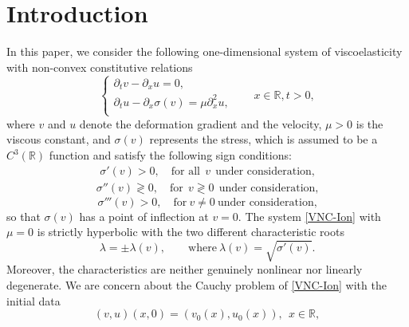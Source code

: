 \documentclass[12pt,reqno]{amsart}
\numberwithin{equation}{section}
\def\p{\partial}
\def\R{\mathbb{R}}
\begin{document}


%
\section{Introduction} 
In this paper, we consider the following one-dimensional system of viscoelasticity with non-convex constitutive relations  
\begin{equation}\label{VNC-Ion}
	\begin{cases}
		\p_tv-\p_xu=0,&\quad\\
		\p_tu-\p_x{\sigma(v)}=\mu\p^2_xu,&\quad\\
	\end{cases}x\in \R, t>0,
\end{equation}
where $v$ and $u$ denote the deformation gradient and the velocity, $\mu>0$ is the viscous constant, and $\sigma(v)$ represents the stress, which is assumed to be a $C^3(\R)$ function and satisfy the following sign conditions:
\begin{equation}\label{SC}
	\begin{aligned}
		\sigma'(v)>0,\quad \text{for all}~~v ~~\text{under consideration,}
	\end{aligned}
\end{equation}
\begin{equation}\label{SC2}
	\begin{aligned}
		\sigma''(v)\gtrless 0,\quad \text{for} ~~ v\gtrless0 ~~\text{under consideration,}
	\end{aligned}
\end{equation}
\begin{equation}\label{SC3}
	\sigma'''(v)>0, \quad \text{for}~ v\neq0~\text{under consideration,}
\end{equation}
so that $\sigma(v)$ has a point of inflection at $v=0$. The system \eqref{VNC-Ion} with $\mu=0$ is strictly hyperbolic with the two different characteristic roots
\begin{equation}\label{characteristic roots}
	\lambda=\pm \lambda(v),\qquad \text{where}~\lambda(v)=\sqrt{\sigma'(v)}.
\end{equation}
Moreover, the characteristics are neither genuinely nonlinear nor linearly degenerate. We are concern about  the Cauchy problem of \eqref{VNC-Ion} with the initial data
\begin{equation}\label{initial}
	(v,u)(x,0)=(v_0(x),u_0(x)),~~x\in\R,
\end{equation} 
\end{document}
